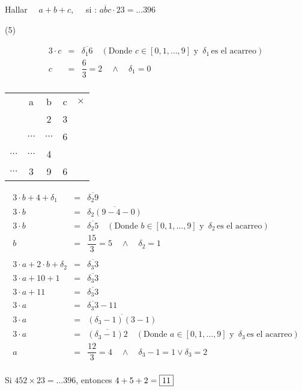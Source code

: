 \item{Hallar $\quad a + b + c{,}\quad$ si : $\overline{abc} \cdot 23 = \ldots 396$
	\begin{tasks}(5)
	\end{tasks}
	\begin{eqnarray*}
		3 \cdot c &=& \overline{\delta_1 6}\quad (\text{Donde } c \in [0, 1, \ldots, 9] \text{ y } \,\delta_1\, \text{es el acarreo})\\
		c &=& \dfrac{6}{3} = 2 \quad \wedge\quad \delta_1 = 0 \\
	\end{eqnarray*}
	\begin{center}
		\begin{tabular}{ccccl}
		\empty & a & b & c & $\times$ \\
		\empty & \empty & 2 & 3 & \empty \\
		\hline
		\empty & $\ldots$ & $\ldots$ & 6 & \empty \\
		$\ldots$ & $\ldots$ & 4 & \empty & \empty \\
		\hline
		$\ldots$ & 3 & 9 & 6 & \empty \\
		\end{tabular}
	\end{center}
	
	\begin{eqnarray*}
		3 \cdot b + 4 + \delta_1 &=& \overline{\delta_2 9} \\
		3 \cdot b &=& \overline{\delta_2 (9 - 4 - 0)} \\
		3 \cdot b &=& \overline{\delta_2 5}\quad (\text{Donde } b \in [0, 1, \ldots, 9] \text{ y } \,\delta_2\, \text{es el acarreo})\\
		b &=& \dfrac{15}{3} = 5 \quad \wedge\quad \delta_2 = 1 \\
		\\
		3 \cdot a + 2 \cdot b + \delta_2 &=& \overline{\delta_3 3} \\
		3 \cdot a + 10 + 1 &=& \overline{\delta_3 3} \\
		3 \cdot a + 11 &=& \overline{\delta_3 3} \\
		3 \cdot a &=& \overline{\delta_3 3} - 11 \\
		3 \cdot a &=& \overline{(\delta_3 - 1)(3 - 1)} \\
		3 \cdot a &=& \overline{(\delta_3 - 1) 2}\quad (\text{Donde } a \in [0, 1, \ldots, 9] \text{ y } \,\delta_3\, \text{es el acarreo})\\
		a &=& \dfrac{12}{3} = 4 \quad \wedge\quad \delta_3 - 1 = 1 \vee \delta_3 = 2 \\
	\end{eqnarray*}
	
	\noindent Si $452 \times 23 = \ldots 396 $, entonces $ 4 + 5 + 2 = \fbox{11}$
}